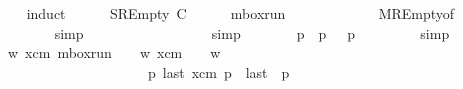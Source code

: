 \begin{isabellebody}
\ \ \isamarkupfalse%
\ induct\isanewline
\ \ \ \ \isamarkupfalse%
\ {\isacharparenleft}{\kern0pt}SREmpty\ C{\isacharparenright}{\kern0pt}\isanewline
\ \ \ \ \isamarkupfalse%
\ {\isachardoublequoteopen}mbox{\isacharunderscore}{\kern0pt}run\ {\isasymC}\isactrlsub {\isasymI}\isactrlsub {\isasymmm}\ {\isacharparenleft}{\kern0pt}{\isasymB}\ {}{\isacharparenright}{\kern0pt}\ {\isasymepsilon}\ {\isacharbrackleft}{\kern0pt}{\isacharbrackright}{\kern0pt}{\isachardoublequoteclose}\isanewline
\ \ \ \ \ \ \isamarkupfalse%
\ MREmpty{\isacharbrackleft}{\kern0pt}of\ {\isasymC}\isactrlsub {\isasymI}\isactrlsub {\isasymmm}\ {\isachardoublequoteopen}{\isasymB}\ {}{\isachardoublequoteclose}{\isacharbrackright}{\kern0pt}\isanewline
\ \ \ \ \ \ \isamarkupfalse%
\ simp\isanewline
\ \ \ \ \isamarkupfalse%
\ \isamarkupfalse%
\ {\isachardoublequoteopen}{\isasymepsilon}\ {\isacharequal}{\kern0pt}\ {\isasymepsilon}{\isasymdown}\isactrlsub {\isacharbang}{\kern0pt}{\isachardoublequoteclose}\isanewline
\ \ \ \ \ \ \isamarkupfalse%
\ simp\isanewline
\ \ \ \ \isamarkupfalse%
\ \isamarkupfalse%
\ {\isachardoublequoteopen}{\isasymforall}p{\isachardot}{\kern0pt}\ {\isasymC}\isactrlsub {\isasymI}\isactrlsub {\isasymmm}\ p\ {\isacharequal}{\kern0pt}\ {\isacharparenleft}{\kern0pt}{\isasymC}\isactrlsub {\isasymI}\isactrlsub {\isasymzero}\ p{\isacharcomma}{\kern0pt}\ {\isasymepsilon}{\isacharparenright}{\kern0pt}{\isachardoublequoteclose}\isanewline
\ \ \ \ \ \ \isamarkupfalse%
\ simp\isanewline
\ \ \ \ \isamarkupfalse%
\ \isamarkupfalse%
\ {\isachardoublequoteopen}{\isasymexists}w\ xcm{\isachardot}{\kern0pt}\ mbox{\isacharunderscore}{\kern0pt}run\ {\isasymC}\isactrlsub {\isasymI}\isactrlsub {\isasymmm}\ {\isacharparenleft}{\kern0pt}{\isasymB}\ {}{\isacharparenright}{\kern0pt}\ w\ xcm\ {\isasymand}\ {\isasymepsilon}\ {\isacharequal}{\kern0pt}\ w{\isasymdown}\isactrlsub {\isacharbang}{\kern0pt}\ {\isasymand}\isanewline
\ \ \ \ \ \ \ \ \ \ \ \ \ \ \ \ \ \ \ \ \ {\isacharparenleft}{\kern0pt}{\isasymforall}p{\isachardot}{\kern0pt}\ last\ {\isacharparenleft}{\kern0pt}{\isasymC}\isactrlsub {\isasymI}\isactrlsub {\isasymmm}{\isacharhash}{\kern0pt}xcm{\isacharparenright}{\kern0pt}\ p\ {\isacharequal}{\kern0pt}\ {\isacharparenleft}{\kern0pt}last\ {\isacharbrackleft}{\kern0pt}{\isasymC}\isactrlsub {\isasymI}\isactrlsub {\isasymzero}{\isacharbrackright}{\kern0pt}\ p{\isacharcomma}{\kern0pt}\ {\isasymepsilon}{\isacharparenright}{\kern0pt}{\isacharparenright}{\kern0pt}{\isachardoublequoteclose}\isanewline

\end{isabellebody}

